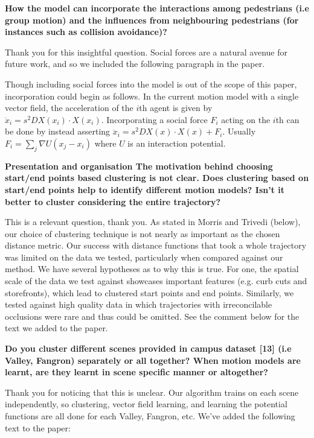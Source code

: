\documentclass[usenames,dvipsnames]{article}
\providecommand{\response}[1]{
\noindent
\noindent\colorbox{gray!20}{
\parbox{\textwidth}{
\setlength{\parskip}{.1in}
\setlength{\parindent}{.1in}
#1}
}
}
\begin{document}
\begin{enumerate}
\begin{item}
\textbf{How the model can incorporate the interactions among pedestrians (i.e
group motion) and the influences from neighbouring pedestrians (for
instances such as collision avoidance)?}
\end{item}
Thank you for this insightful question. Social forces are a natural avenue for future work, and so we included the following paragraph in the paper.

\response{Though including social forces into the model is out of the scope of this paper, incorporation could begin as follows.  In the current motion model with a single vector field, the acceleration of the $i$th agent is given by $\ddot{x}_i = s^2 DX(x_i) \cdot X(x_i)$.  Incorporating a social force $F_{i}$ acting on the $i$th can be done by instead asserting $\ddot{x}_i = s^2 DX(x) \cdot X(x) + F_i$.  Usually $F_{i} = \sum_{j} \nabla U( x_j - x_i)$ where $U$ is an interaction potential.}


\begin{item}
\textbf{Presentation and organisation
The motivation behind choosing start/end points based clustering is not
clear. Does clustering based on start/end points help to identify
different motion models? Isn't it better to cluster considering the
entire trajectory? }
\end{item}
This is a relevant question, thank you. As stated in Morris and Trivedi (below), our choice of clustering technique is not nearly as important as the chosen distance metric. Our success with distance functions that took a whole trajectory was limited on the data we tested, particularly when compared against our method. We have several hypotheses as to why this is true.  For one, the spatial scale of the data we test against showcases important features (e.g. curb cuts and storefronts), which lead to clustered start points and end points. Similarly, we tested against high quality data in which trajectories with irreconcilable occlusions were rare and thus could be omitted. See the comment below for the text we added to the paper.



\begin{item}
\textbf{Do you cluster different scenes provided in campus dataset [13] (i.e
Valley, Fangron) separately or all together? When motion models are
learnt, are they learnt in scene specific manner or altogether?}
\end{item}
Thank you for noticing that this is unclear. Our algorithm trains on each scene independently, so clustering, vector field learning, and learning the potential functions are all done for each Valley, Fangron, etc. We've added the following text to the paper:


\end{enumerate}
\end{document}
